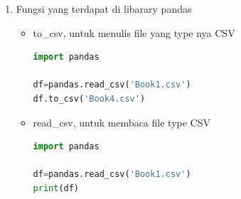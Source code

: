 \begin{enumerate}
	\item Fungsi yang terdapat di libarary pandas
	\begin{itemize}
	\item to\_csv, untuk menulis file yang type nya CSV
	\begin{lstlisting}[language=Python]
import pandas

df=pandas.read_csv('Book1.csv')
df.to_csv('Book4.csv')

\end{lstlisting}
	\end{itemize}
	\begin{itemize}
	\item read\_csv, untuk membaca file type CSV
	\begin{lstlisting}[language=Python]
import pandas

df=pandas.read_csv('Book1.csv')
print(df)

\end{lstlisting}
	\end{itemize}
	
	
\end{enumerate}


